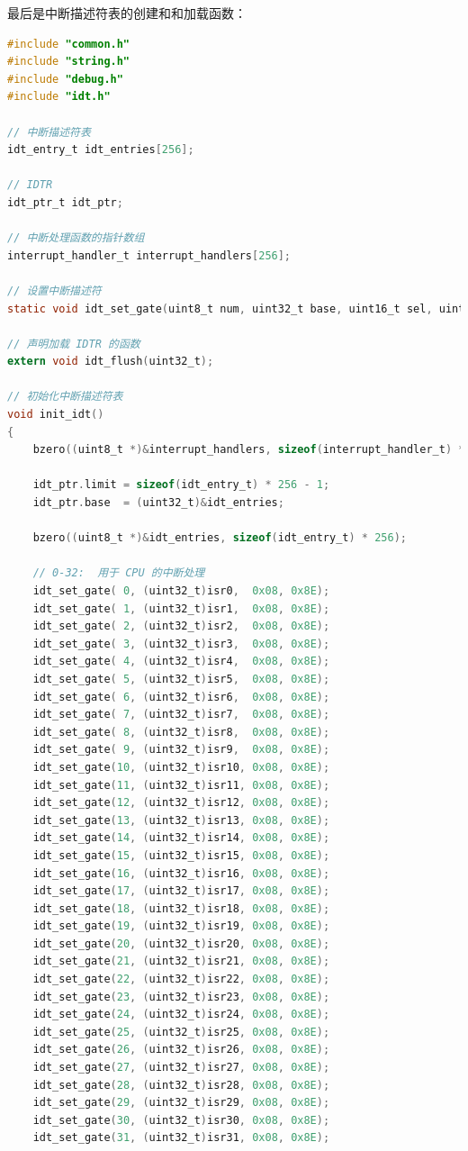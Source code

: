 \par 最后是中断描述符表的创建和和加载函数：
\begin{lstlisting}[language = C, caption = idt/idt.c]
#include "common.h"
#include "string.h"
#include "debug.h"
#include "idt.h"

// 中断描述符表
idt_entry_t idt_entries[256];

// IDTR
idt_ptr_t idt_ptr;

// 中断处理函数的指针数组
interrupt_handler_t interrupt_handlers[256];

// 设置中断描述符
static void idt_set_gate(uint8_t num, uint32_t base, uint16_t sel, uint8_t flags);

// 声明加载 IDTR 的函数
extern void idt_flush(uint32_t);

// 初始化中断描述符表
void init_idt()
{	
	bzero((uint8_t *)&interrupt_handlers, sizeof(interrupt_handler_t) * 256);
	
	idt_ptr.limit = sizeof(idt_entry_t) * 256 - 1;
	idt_ptr.base  = (uint32_t)&idt_entries;
	
	bzero((uint8_t *)&idt_entries, sizeof(idt_entry_t) * 256);

	// 0-32:  用于 CPU 的中断处理
	idt_set_gate( 0, (uint32_t)isr0,  0x08, 0x8E);
	idt_set_gate( 1, (uint32_t)isr1,  0x08, 0x8E);
	idt_set_gate( 2, (uint32_t)isr2,  0x08, 0x8E);
	idt_set_gate( 3, (uint32_t)isr3,  0x08, 0x8E);
	idt_set_gate( 4, (uint32_t)isr4,  0x08, 0x8E);
	idt_set_gate( 5, (uint32_t)isr5,  0x08, 0x8E);
	idt_set_gate( 6, (uint32_t)isr6,  0x08, 0x8E);
	idt_set_gate( 7, (uint32_t)isr7,  0x08, 0x8E);
	idt_set_gate( 8, (uint32_t)isr8,  0x08, 0x8E);
	idt_set_gate( 9, (uint32_t)isr9,  0x08, 0x8E);
	idt_set_gate(10, (uint32_t)isr10, 0x08, 0x8E);
	idt_set_gate(11, (uint32_t)isr11, 0x08, 0x8E);
	idt_set_gate(12, (uint32_t)isr12, 0x08, 0x8E);
	idt_set_gate(13, (uint32_t)isr13, 0x08, 0x8E);
	idt_set_gate(14, (uint32_t)isr14, 0x08, 0x8E);
	idt_set_gate(15, (uint32_t)isr15, 0x08, 0x8E);
	idt_set_gate(16, (uint32_t)isr16, 0x08, 0x8E);
	idt_set_gate(17, (uint32_t)isr17, 0x08, 0x8E);
	idt_set_gate(18, (uint32_t)isr18, 0x08, 0x8E);
	idt_set_gate(19, (uint32_t)isr19, 0x08, 0x8E);
	idt_set_gate(20, (uint32_t)isr20, 0x08, 0x8E);
	idt_set_gate(21, (uint32_t)isr21, 0x08, 0x8E);
	idt_set_gate(22, (uint32_t)isr22, 0x08, 0x8E);
	idt_set_gate(23, (uint32_t)isr23, 0x08, 0x8E);
	idt_set_gate(24, (uint32_t)isr24, 0x08, 0x8E);
	idt_set_gate(25, (uint32_t)isr25, 0x08, 0x8E);
	idt_set_gate(26, (uint32_t)isr26, 0x08, 0x8E);
	idt_set_gate(27, (uint32_t)isr27, 0x08, 0x8E);
	idt_set_gate(28, (uint32_t)isr28, 0x08, 0x8E);
	idt_set_gate(29, (uint32_t)isr29, 0x08, 0x8E);
	idt_set_gate(30, (uint32_t)isr30, 0x08, 0x8E);
	idt_set_gate(31, (uint32_t)isr31, 0x08, 0x8E);


\end{lstlisting}

